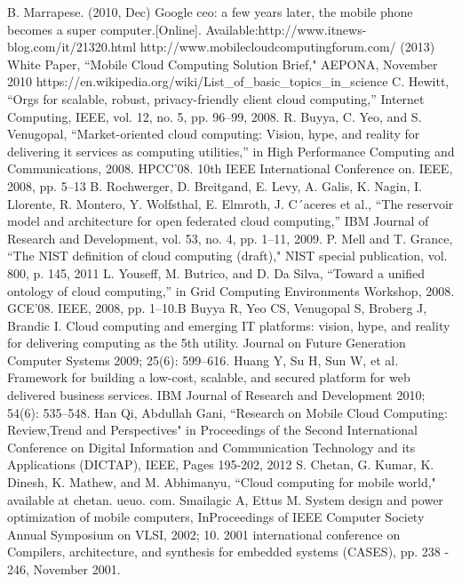 \documentclass[10pt, conference, compsocconf]{IEEEtran}
\begin{document}
\begin{thebibliography}{16}
B. Marrapese. (2010, Dec) Google ceo: a few years later, the mobile phone becomes a super computer.[Online]. Available:http://www.itnews-blog.com/it/21320.html
http://www.mobilecloudcomputingforum.com/ (2013)
White Paper, ``Mobile Cloud Computing Solution Brief," AEPONA, November 2010
https://en.wikipedia.org/wiki/List\_of\_basic\_topics\_in\_science
C. Hewitt, ``Orgs for scalable, robust, privacy-friendly client cloud computing,” Internet Computing, IEEE, vol. 12, no. 5, pp. 96–99, 2008.
R. Buyya, C. Yeo, and S. Venugopal, ``Market-oriented cloud computing: Vision, hype, and reality for delivering it services as computing utilities,” in High Performance Computing and Communications, 2008. HPCC’08. 10th IEEE International Conference on. IEEE, 2008, pp. 5–13
B. Rochwerger, D. Breitgand, E. Levy, A. Galis, K. Nagin, I. Llorente, R. Montero, Y. Wolfsthal, E. Elmroth, J. C´aceres et al., ``The reservoir model and architecture for open federated cloud computing,” IBM Journal of Research and Development, vol. 53, no. 4, pp. 1–11, 2009.
P. Mell and T. Grance, ``The NIST definition of cloud computing (draft)," NIST special publication, vol. 800, p. 145, 2011
L. Youseff, M. Butrico, and D. Da Silva, ``Toward a unified ontology of cloud computing,” in Grid Computing Environments Workshop, 2008. GCE’08. IEEE, 2008, pp. 1–10.B
Buyya R, Yeo CS, Venugopal S, Broberg J, Brandic I. Cloud computing and emerging IT platforms: vision, hype, and reality for delivering computing as the 5th utility. Journal on Future Generation Computer Systems 2009; 25(6): 599–616.
Huang Y, Su H, Sun W, et al. Framework for building a low-cost, scalable, and secured platform for web delivered business services. IBM Journal of Research and Development 2010; 54(6): 535–548.
Han Qi, Abdullah Gani, ``Research on Mobile Cloud Computing: Review,Trend and Perspectives" in Proceedings of the Second International Conference on Digital Information and Communication Technology and its Applications (DICTAP), IEEE, Pages 195-202, 2012
S. Chetan, G. Kumar, K. Dinesh, K. Mathew, and M. Abhimanyu, ``Cloud computing for mobile world," available at chetan. ueuo. com.
Smailagic A, Ettus M. System design and power optimization of mobile computers, InProceedings of IEEE Computer Society Annual Symposium on VLSI, 2002; 10.
2001 international conference on Compilers, architecture, and synthesis for embedded systems (CASES), pp. 238 - 246, November 2001.
\end{thebibliography}




\end{document}
